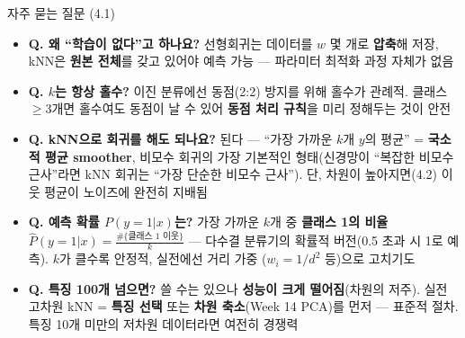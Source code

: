 \begin{frame}{자주 묻는 질문 (4.1)}
  \small
  \begin{itemize}
    \item \textbf{Q. 왜 ``학습이 없다''고 하나요?}
      선형회귀는 데이터를 $w$ 몇 개로 \textbf{압축}해 저장,
      kNN은 \textbf{원본 전체}를 갖고 있어야 예측 가능 ---
      파라미터 최적화 과정 자체가 없음
    \item \textbf{Q. $k$는 항상 홀수?}
      이진 분류에선 동점(2:2) 방지를 위해 홀수가 관례적.
      클래스 $\geq 3$개면 홀수여도 동점이 날 수 있어
      \textbf{동점 처리 규칙}을 미리 정해두는 것이 안전
    \item \textbf{Q. kNN으로 회귀를 해도 되나요?}
      된다 --- ``가장 가까운 $k$개 $y$의 평균'' =
      \textbf{국소적 평균 smoother}, 비모수 회귀의 가장
      기본적인 형태(신경망이 ``복잡한 비모수 근사''라면
      kNN 회귀는 ``가장 단순한 비모수 근사'').
      단, 차원이 높아지면(4.2) 이웃 평균이 노이즈에
      완전히 지배됨
    \item \textbf{Q. 예측 확률 $P(y=1|x)$는?}
      가장 가까운 $k$개 중 \textbf{클래스 1의 비율}
      $\hat P(y=1|x) = \frac{\#\{\text{클래스 1 이웃}\}}{k}$
      --- 다수결 분류기의 확률적 버전(0.5 초과 시 1로 예측).
      $k$가 클수록 안정적, 실전에선 거리 가중
      ($w_i = 1/d^2$ 등)으로 고치기도
    \item \textbf{Q. 특징 100개 넘으면?}
      쓸 수는 있으나 \textbf{성능이 크게 떨어짐}(차원의 저주).
      실전 고차원 kNN = \textbf{특징 선택} 또는
      \textbf{차원 축소}(Week 14 PCA)를 먼저 --- 표준적 절차.
      특징 10개 미만의 저차원 데이터라면 여전히 경쟁력
  \end{itemize}
\end{frame}
